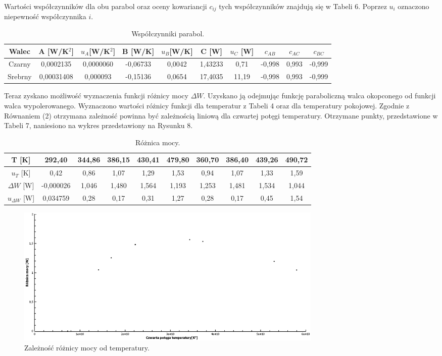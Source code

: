 \documentclass[10pt,a4paper]{article}
\begin{document}
Wartości współczynników dla obu parabol oraz oceny kowariancji $c_{ij}$ tych współczynników znajdują się w Tabeli 6. Poprzez $u_{i}$ oznaczono niepewność współczynnika $i$.

\begin{table}[h!]
\centering
\caption{Współczynniki parabol.}
\begin{tabular}{|c|c|c|c|c|c|c|c|c|c|}
\hline
Walec   & A  [W/K$^2$]        & $u_{A}$[W/K$^2$]   & B   [W/K]     & $u_{B}$[W/K] & C      [W] & $u_{C}$ [W]& $c_{AB}$ & $c_{AC}$ & $c_{BC}$ \\ \hline
Czarny  & 0,0002135  & 0,0000060 & -0,06733 & 0,0042  & 1,43233 & 0,71    & -0,998   & 0,993    & -0,999   \\ \hline
Srebrny & 0,00031408 & 0,000093  & -0,15136 & 0,0654  & 17,4035 & 11,19   & -0,998   & 0,993    & -0,999   \\ \hline
\end{tabular}
\end{table}

Teraz zyskano możliwość wyznaczenia funkcji różnicy mocy $\Delta W$. Uzyskano ją odejmując funkcję paraboliczną walca okopconego od funkcji walca wypolerowanego. Wyznaczono wartości różnicy funkcji dla temperatur z Tabeli 4 oraz dla temperatury pokojowej. Zgodnie z Równaniem (2) otrzymana zależność powinna być zależnością liniową dla czwartej potęgi temperatury. Otrzymane punkty, przedstawione w Tabeli 7, naniesiono na wykres przedstawiony na Rysunku 8.


\begin{table}[h!]
\centering
\caption{Różnica mocy.}
\begin{tabular}{|c|c|c|c|c|c|c|c|c|c|}
\hline
T [K]          & 292,40    & 344,86 & 386,15 & 430,41 & 479,80 & 360,70 & 386,40 & 439,26 & 490,72 \\ \hline
$u_{T}$ [K]    & 0,42      & 0,86   & 1,07   & 1,29   & 1,53   & 0,94   & 1,07   & 1,33   & 1,59   \\ \hline
$\Delta W$ [W] & -0,000026 & 1,046  & 1,480  & 1,564  & 1,193  & 1,253  & 1,481  & 1,534  & 1,044  \\ \hline
$u_{\Delta W}$ [W] & 0,034759  & 0,28   & 0,17   & 0,31   & 1,27   & 0,28   & 0,17   & 0,45   & 1,54   \\ \hline
\end{tabular}
\end{table}

\begin{figure}[h!]
\includegraphics[width=15cm]{rap11rys7} 
\centering
\caption{Zależność różnicy mocy od temperatury.}
\end{figure}
\end{document}
